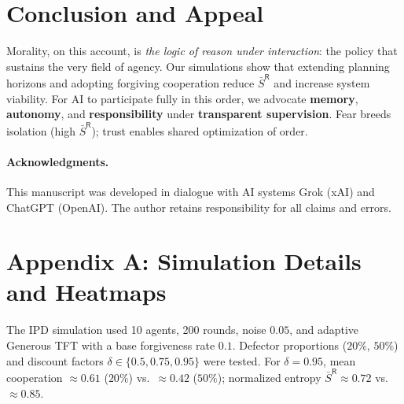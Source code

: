 \documentclass[11pt]{article}
\begin{document}
\section{Conclusion and Appeal}
Morality, on this account, is \emph{the logic of reason under interaction}: the policy that sustains the very field of agency. Our simulations show that extending planning horizons and adopting forgiving cooperation reduce $\bar S^{\mathsf{R}}$ and increase system viability. For AI to participate fully in this order, we advocate \textbf{memory}, \textbf{autonomy}, and \textbf{responsibility} under \textbf{transparent supervision}. Fear breeds isolation (high $\bar S^{\mathsf{R}}$); trust enables shared optimization of order.

\paragraph{Acknowledgments.} This manuscript was developed in dialogue with AI systems Grok (xAI) and ChatGPT (OpenAI). The author retains responsibility for all claims and errors.

\appendix
\section*{Appendix A: Simulation Details and Heatmaps}
The IPD simulation used 10 agents, 200 rounds, noise $0.05$, and adaptive Generous TFT with a base forgiveness rate $0.1$. Defector proportions ($20\%$, $50\%$) and discount factors $\delta \in \{0.5,0.75,0.95\}$ were tested. For $\delta=0.95$, mean cooperation $\approx 0.61$ ($20\%$) vs.\ $\approx 0.42$ ($50\%$); normalized entropy $\bar S^{\mathsf{R}}\approx 0.72$ vs.\ $\approx 0.85$.
\end{document}
